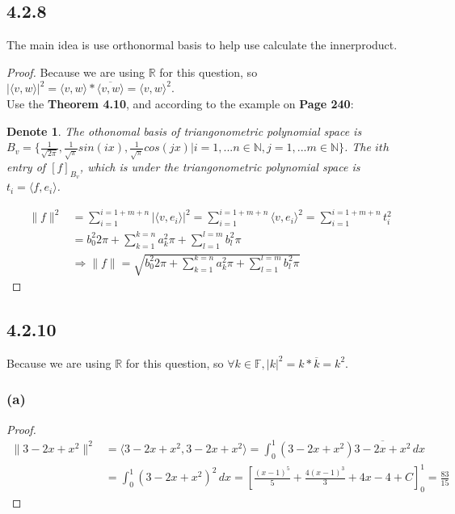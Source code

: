 \documentclass{article}
\newtheorem*{denote}{Denote}
\newtheorem*{proof}{Proof}
\begin{document}
\subsection*{4.2.8}
\noindent The main idea is use orthonormal basis to help use calculate the innerproduct.
\begin{proof}
    Because we are using $\mathbb{R}$ for this question, so $|\langle v, w\rangle|^2 = \langle v, w\rangle * \overline {\langle v, w\rangle} = \langle v, w\rangle^2$. \\
    Use the \textbf{Theorem 4.10}, and according to the example on \textbf{Page 240}:
    \begin{denote}
        The othonomal basis of triangonometric polynomial space is $ B_v = \{ \frac {1} {\sqrt {2 \pi}}, \frac{1}{\sqrt{\pi}} sin(ix), \frac{1}{\sqrt{\pi}} cos(jx) | i = 1, ... n \in \mathbb{N}, j = 1, ... m \in \mathbb{N} \}$. 
        The $ith$ entry of $[f]_{B_v}$, which is under the triangonometric polynomial space is $t_i = \langle f, e_i\rangle$. 
    \end{denote}
    \begin{equation*}
        \begin{split}
            \|f\|^ 2 & = \sum_{i=1}^{i=1+m+n} | \langle v, e_i\rangle|^2 = \sum_{i=1}^{i=1+m+n}  \langle v, e_i\rangle ^2 = \sum_{i=1}^{i=1+m+n} t_i ^2 \\
            & = {b_0 ^ 2}{2 \pi} + \sum_{k=1}^{k=n} {a_k ^2 }{\pi} + \sum_{l=1}^{l=m} {b_l ^2 }{\pi} \\
            & \Rightarrow \|f\| = \sqrt{{b_0^2}{{2 \pi}} + \sum_{k=1}^{k=n}  {a_k ^2 }{\pi} + \sum_{l=1}^{l=m}{b_l ^2 }{\pi}}
        \end{split}
    \end{equation*}
\end{proof}

\subsection*{4.2.10}
Because we are using $\mathbb{R}$ for this question, so $\forall k \in \mathbb{F}, |k|^2 = k * \overline k = k^2$.
\subsubsection*{(a)}
\begin{proof}
    \begin{equation*}
        \begin{split}
            \|3 - 2x + x^2 \|^2 & = \langle 3 - 2x + x^2, 3 - 2x + x^2 \rangle = \int_{0}^{1} (3 - 2x + x^2) \overline {3 - 2x + x^2} \,dx \\
                                & = \int_{0}^{1} (3 - 2x + x^2)^2 \,dx = [\frac{(x - 1)^5}{5} + \frac{4(x - 1)^3}{3} + 4x - 4 + C ]^1_0 = \frac{83}{15}
        \end{split}
    \end{equation*} 
\end{proof}
\end{document}

